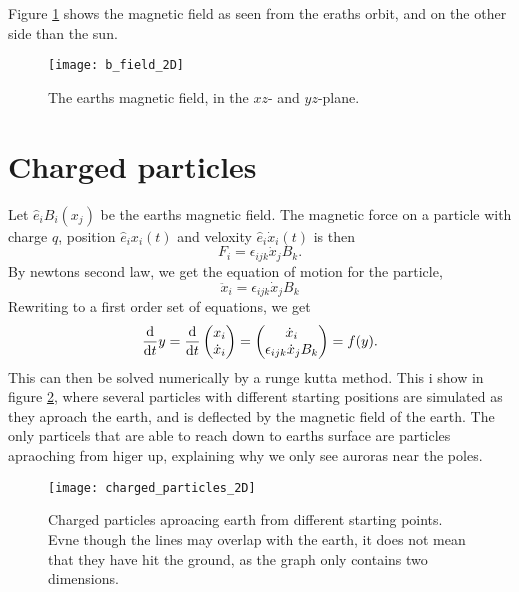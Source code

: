 \documentclass{article}
\begin{document}
        Figure \ref{B-field} shows the magnetic field as seen from the eraths orbit, and on the other side than the sun. 
        
        \begin{figure}
            \centering    
            \texttt{[image: b\_field\_2D]}
            \caption{The earths magnetic field, in the $xz$- and $yz$-plane.  }
            \label{B-field}
        \end{figure}

    \section*{Charged particles}
        Let $ \hat e_i B_i(x_j)$ be the earths magnetic field. The magnetic force on a particle with charge $q$, position $\hat e_i x_i(t)$ and veloxity $\hat e_i \dot x_i (t)$ is then
        \begin{equation}
            F_i = \epsilon_{ijk} \dot x_j B_k.
        \end{equation}
        By newtons second law, we get the equation of motion for the particle,
        \begin{equation}
            \ddot x_i = \epsilon_{ijk} \dot x_j B_k
        \end{equation}
        Rewriting to a first order set of equations, we get
        \begin{align*}
            \dv{t} y = \dv{t} 
            \begin{pmatrix}
                x_i \\
                \dot x_i
            \end{pmatrix}
            = 
            \begin{pmatrix}
                \dot x_i \\
                \epsilon_{ijk} \dot x_j B_k
            \end{pmatrix}
            = f(y).
        \end{align*}
        This can then be solved numerically by a runge kutta method. This i show in figure \ref{Charged particles}, where several particles with different starting positions are simulated as they aproach the earth, and is deflected by the magnetic field of the earth. The only particels that are able to reach down to earths surface are particles apraoching from higer up, explaining why we only see auroras near the poles.

        
        \begin{figure}
            \centering
            \vspace{-50px}
            \texttt{[image: charged\_particles\_2D]}
            \caption{Charged particles aproacing earth from different starting points. Evne though the lines may overlap with the earth, it does not mean that they have hit the ground, as the graph only contains two dimensions.}
            \label{Charged particles}
        \end{figure}
\end{document}
